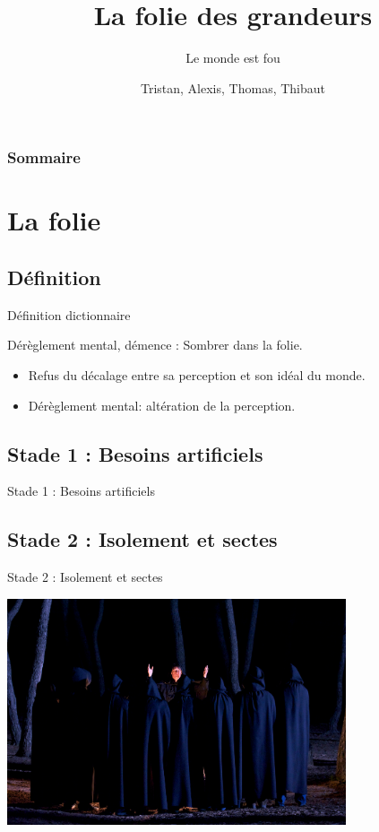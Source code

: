 \documentclass{beamer}
\title{La folie des grandeurs}
\subtitle{Le monde est fou}
\author{Tristan, Alexis, Thomas, Thibaut}
\begin{document}
\begin{frame}
  \titlepage
\end{frame}

\begin{frame}
    \frametitle{Sommaire}
    \begin{multicols}{2}
      {
		\setcounter{tocdepth}{1}
        \tableofcontents
      }
    \end{multicols}
\end{frame}

\section{La folie}

\subsection{Définition}
\begin{frame}{Définition dictionnaire}
  \begin{displayquote}
    Dérèglement mental, démence : Sombrer dans la folie.
  \end{displayquote}
\end{frame}

\begin{frame}
  \begin{itemize}
    \item Refus du décalage entre sa perception et son idéal du monde.
    \item Dérèglement mental: altération de la perception.
  \end{itemize}
\end{frame}

\subsection{Stade 1 : Besoins artificiels}
\begin{frame}{Stade 1 : Besoins artificiels}

\end{frame}


\subsection{Stade 2 : Isolement et sectes}
\begin{frame}{Stade 2 : Isolement et sectes}
  \begin{center}
    \includegraphics[width=10cm]{../Images/secte.png}
  \end{center}
\end{frame}
\end{document}
